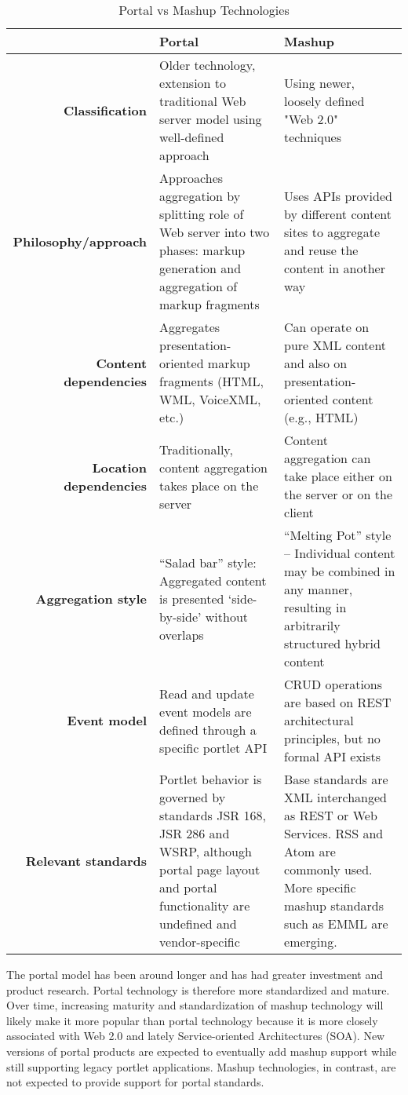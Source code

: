 		\begin{table}[H]
		\centering
		\begin{tabular}{|r|L{5cm}|L{5cm}|}
		\hline
		 			                       & \textbf{Portal} & \textbf{Mashup} \\
		\hline 
		\hline
		\textbf{Classification}   & Older technology, extension to traditional Web server model using well-defined approach & Using newer, loosely defined "Web 2.0" techniques \\
		\hline
		\textbf{Philosophy/approach}       & Approaches aggregation by splitting role of Web server into two phases: markup generation and aggregation of markup fragments & Uses APIs provided by different content sites to aggregate and reuse the content in another way \\
		\hline
		\textbf{Content dependencies}	   & Aggregates presentation-oriented markup fragments (HTML, WML, VoiceXML, etc.) & Can operate on pure XML content and also on presentation-oriented content (e.g., HTML) \\
		\hline
		\textbf{Location dependencies}  & Traditionally, content aggregation takes place on the server & Content aggregation can take place either on the server or on the client \\
		\hline
		\textbf{Aggregation style}		   & “Salad bar” style: Aggregated content is presented ‘side-by-side’ without overlaps & “Melting Pot” style – Individual content may be combined in any manner, resulting in arbitrarily structured hybrid content \\
		\hline
		\textbf{Event model}		       & Read and update event models are defined through a specific portlet API & CRUD operations are based on REST architectural principles, but no formal API exists \\
		\hline
		\textbf{Relevant standards}		   & Portlet behavior is governed by standards JSR 168, JSR 286 and WSRP, although portal page layout and portal functionality are undefined and vendor-specific & Base standards are XML interchanged as REST or Web Services. RSS and Atom are commonly used. More specific mashup standards such as EMML are emerging. \\
		\hline
		\end{tabular}
		\caption[Portal vs Mashup Technology]{Portal vs Mashup Technologies}
		\label{tab:Portal_Mashup}
		\end{table}
		
	The portal model has been around longer and has had greater investment and product research. Portal technology is therefore more standardized and mature. Over time, increasing maturity and standardization of mashup technology will likely make it more popular than portal technology because it is more closely associated with Web 2.0 and lately Service-oriented Architectures (SOA). New versions of portal products are expected to eventually add mashup support while still supporting legacy portlet applications. Mashup technologies, in contrast, are not expected to provide support for portal standards.

